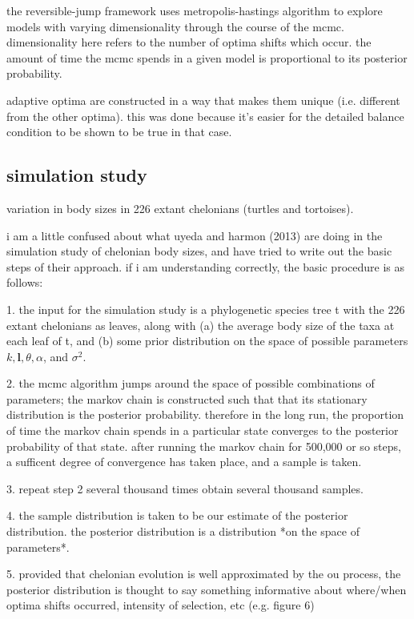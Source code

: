 \documentclass{article}
\begin{document}
the reversible-jump framework uses metropolis-hastings algorithm to explore
models with varying dimensionality through the course of the mcmc.
dimensionality here refers to the number of optima shifts which occur. the
amount of time the mcmc spends in a given model is proportional to its posterior
probability.

adaptive optima are constructed in a way that makes them unique (i.e. different
from the other optima). this was done because it's easier for the detailed
balance condition to be shown to be true in that case.


\subsection{simulation study}
variation in body sizes in 226 extant chelonians (turtles and tortoises).

i am a little confused about what uyeda and harmon (2013) are doing in the
simulation study of chelonian body sizes, and have tried to write out the basic
steps of their approach. if i am understanding correctly, the basic procedure is
as follows:

1. the input for the simulation study is a phylogenetic species tree t with
the 226 extant chelonians as leaves, along with (a) the average body size of the
taxa at each leaf of t, and (b) some prior distribution on the space of
possible parameters $k, \mathbf{l}, \theta, \alpha$, and $\sigma^{2}$.

2. the mcmc algorithm jumps around the space of possible combinations of
parameters; the markov chain is constructed such that that its stationary
distribution is the posterior probability. therefore in the long run, the
proportion of time the markov chain spends in a particular state converges to
the posterior probability of that state. after running the markov chain for
500,000 or so steps, a sufficent degree of convergence has taken place, and a
sample is taken.

3. repeat step 2 several thousand times obtain several thousand samples.

4. the sample distribution is taken to be our estimate of the posterior
distribution. the posterior distribution is a distribution *on the space of
parameters*.

5. provided that chelonian evolution is well approximated by the ou process, the
posterior distribution is thought to say something informative about where/when
optima shifts occurred, intensity of selection, etc (e.g. figure 6)
\end{document}
